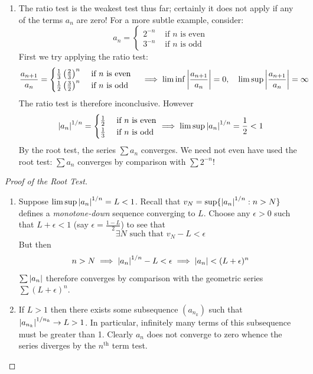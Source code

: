 \begin{examples}{}{}
\begin{enumerate}
	\item The ratio test is the weakest test thus far; certainly it does not apply if any of the terms $a_n$ are zero! For a more subtle example, consider:
	\[a_n=\begin{cases}
	2^{-n}&\text{ if $n$ is even}\\
	3^{-n}&\text{ if $n$ is odd}
	\end{cases}\]
	First we try applying the ratio test:
	\[\frac{a_{n+1}}{a_n}=\begin{cases}
	\frac 13\left(\frac 23\right)^{n}&\text{ if $n$ is even}\\
	\frac 12\left(\frac 32\right)^{n}&\text{ if $n$ is odd}
	\end{cases}\quad\implies \liminf\left| \frac{a_{n+1}}{a_n}\right|=0,\quad \limsup\left| \frac{a_{n+1}}{a_n}\right|=\infty\]
	The ratio test is therefore inconclusive.	However
	\[\left| a_n\right|^{1/n}=\begin{cases}
	\frac 12&\text{ if $n$ is even}\\
	\frac 13&\text{ if $n$ is odd}
	\end{cases}\implies \limsup\left| a_n\right|^{1/n}=\frac 12<1\]
	By the root test, the series $\sum a_n$ converges.
	We need not even have used the root test: $\sum a_n$ converges by comparison with $\sum 2^{-n}$!
\end{enumerate}
\end{examples}




\begin{proof}[Proof of the Root Test]
\begin{enumerate}
	\item Suppose $\limsup\left| a_n\right|^{1/n}=L<1$. Recall that $v_N=\sup\{\left| a_n\right|^{1/n}:n>N\}$ defines a \emph{monotone-down} sequence converging to $L$. Choose any $\epsilon>0$ such that $L+\epsilon<1$ (say $\epsilon=\frac{1-L}2$) to see that
	\[\exists N\text{ such that }v_N-L<\epsilon \]
	But then
	\[n>N\implies\left| a_n\right|^{1/n}-L<\epsilon\implies \left| a_n\right|<(L+\epsilon)^n\]
	$\sum\left| a_n\right|$ therefore converges by comparison with the geometric series $\sum(L+\epsilon)^n$.
	
	\item If $L>1$ then there exists some subsequence $(a_{n_k})$ such that $\left| a_{n_k}\right|^{1/n_k}\to L>1$. In particular, infinitely many terms of this subsequence must be greater than 1. Clearly $a_n$ does not converge to zero whence the series diverges by the $n^\text{th}$ term test.\hfill\qedhere
\end{enumerate}
\end{proof}

